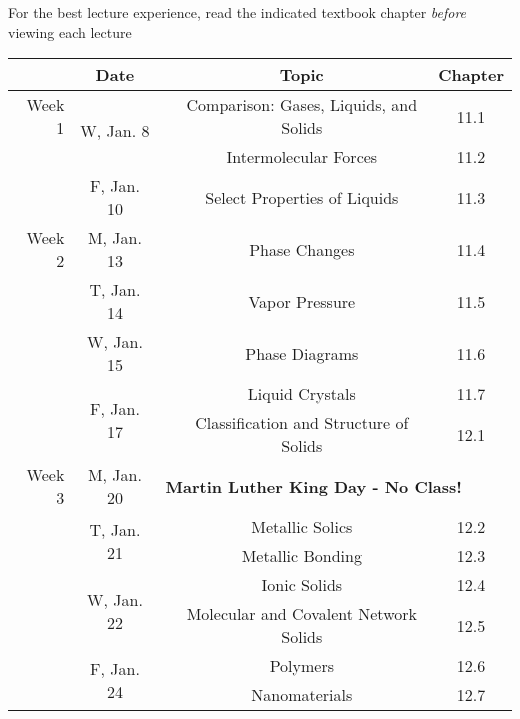 \documentclass[12pt, letterpaper]{article}
\begin{document}
\noindent For the best lecture experience, read the indicated textbook chapter \emph{before} viewing each lecture

\begin{tabular}{rcccc}
& Date && Topic & Chapter\\
\midrule
Week 1 & \multirow{2}{*}{W, Jan. 8}& & Comparison: Gases, Liquids, and Solids & 11.1\\
& & & Intermolecular Forces & 11.2\\
& F, Jan. 10&& Select Properties of Liquids & 11.3\\
\midrule
Week 2 & M, Jan. 13&& Phase Changes & 11.4\\
& T, Jan. 14&& Vapor Pressure & 11.5\\
& W, Jan. 15&& Phase Diagrams & 11.6\\
& \multirow{2}{*}{F, Jan. 17}& & Liquid Crystals & 11.7\\
& & & Classification and Structure of Solids & 12.1\\
\midrule
Week 3 & M, Jan. 20& \multicolumn{3}{l}{\textbf{Martin Luther King Day - No Class!}}\\
& \multirow{2}{*}{T, Jan. 21}& & Metallic Solics & 12.2\\
& & & Metallic Bonding & 12.3\\
& \multirow{2}{*}{W, Jan. 22}& & Ionic Solids & 12.4\\
& & & Molecular and Covalent Network Solids & 12.5\\
& \multirow{2}{*}{F, Jan. 24}& & Polymers & 12.6\\
& & & Nanomaterials & 12.7\\
\end{tabular}
\end{document}
